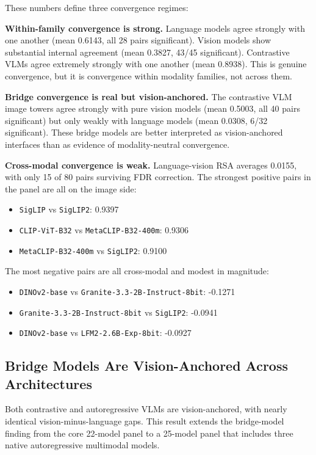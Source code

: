 \documentclass[11pt,a4paper]{article}
\providecommand{\tightlist}{%
  \setlength{\itemsep}{0pt}\setlength{\parskip}{0pt}}
\begin{document}
These numbers define three convergence regimes:

\textbf{Within-family convergence is strong.} Language models agree
strongly with one another (mean 0.6143, all 28 pairs significant).
Vision models show substantial internal agreement (mean 0.3827, 43/45
significant). Contrastive VLMs agree extremely strongly with one another
(mean 0.8938). This is genuine convergence, but it is convergence within
modality families, not across them.

\textbf{Bridge convergence is real but vision-anchored.} The contrastive
VLM image towers agree strongly with pure vision models (mean 0.5003,
all 40 pairs significant) but only weakly with language models (mean
0.0308, 6/32 significant). These bridge models are better interpreted as
vision-anchored interfaces than as evidence of modality-neutral
convergence.

\textbf{Cross-modal convergence is weak.} Language-vision RSA averages
0.0155, with only 15 of 80 pairs surviving FDR correction. The strongest
positive pairs in the panel are all on the image side:

\begin{itemize}
\tightlist
\item
  \texttt{SigLIP} vs \texttt{SigLIP2}: 0.9397
\item
  \texttt{CLIP-ViT-B32} vs \texttt{MetaCLIP-B32-400m}: 0.9306
\item
  \texttt{MetaCLIP-B32-400m} vs \texttt{SigLIP2}: 0.9100
\end{itemize}

The most negative pairs are all cross-modal and modest in magnitude:

\begin{itemize}
\tightlist
\item
  \texttt{DINOv2-base} vs \texttt{Granite-3.3-2B-Instruct-8bit}: -0.1271
\item
  \texttt{Granite-3.3-2B-Instruct-8bit} vs \texttt{SigLIP2}: -0.0941
\item
  \texttt{DINOv2-base} vs \texttt{LFM2-2.6B-Exp-8bit}: -0.0927
\end{itemize}

\subsection{Bridge Models Are Vision-Anchored Across
Architectures}\label{bridge-models-are-vision-anchored-across-architectures}

Both contrastive and autoregressive VLMs are vision-anchored, with
nearly identical vision-minus-language gaps. This result extends the
bridge-model finding from the core 22-model panel to a 25-model panel
that includes three native autoregressive multimodal models.
\end{document}
